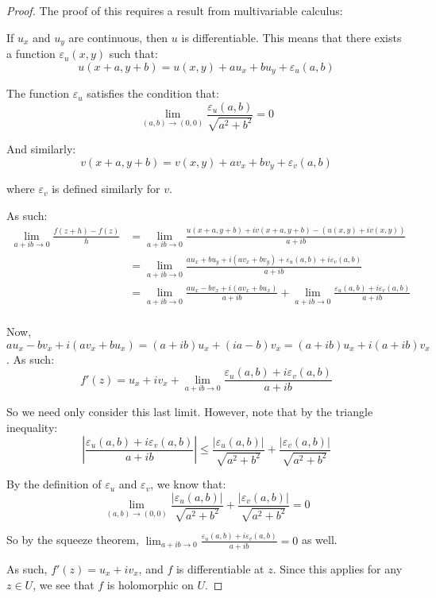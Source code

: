 \begin{proof} The proof of this requires a result from multivariable calculus:

If $u_x$ and $u_y$ are continuous, then $u$ is differentiable. This means that there exists a function $\varepsilon_u(x,y)$ such that:
$$u(x + a,y+b) = u(x,y) + au_x + bu_y  + \varepsilon_u(a,b)$$

\noin The function $\varepsilon_u$ satisfies the condition that:
$$\lim_{(a,b) \rightarrow (0,0)} \frac{\varepsilon_u(a,b)}{\sqrt{a^2 + b^2}} = 0$$

And similarly:
$$v(x + a,y+b) = v(x,y) + av_x + bv_y  + \varepsilon_v(a,b)$$

\noin where $\varepsilon_v$ is defined similarly for $v$.

As such:
\begin{align*}\lim_{a+ib \rightarrow 0} \frac{f(z + h) - f(z)}{h} &= \lim_{a+ib \rightarrow 0} \frac{u(x+a,y+b) + iv(x+a,y+b) - (u(x,y) + iv(x,y))}{a+ib}\\
&= \lim_{a+ib \rightarrow 0} \frac{au_x + bu_y + i(av_x + bv_y) + \varepsilon_u(a,b) + i\varepsilon_v(a,b)}{a+ib}\\
&= \lim_{a+ib \rightarrow 0} \frac{au_x - bv_x + i(av_x + bu_x)}{a + ib} +\lim_{a+ib \rightarrow 0} \frac{\varepsilon_u(a,b) + i\varepsilon_v(a,b)}{a+ib}\\
\end{align*}

Now, $au_x -bv_x + i(av_x + bu_x) = (a+ib)u_x + (ia - b)v_x = (a+ib)u_x + i(a+ib)v_x$. As such:
$$f'(z) = u_x + iv_x  +\lim_{a+ib \rightarrow 0} \frac{\varepsilon_u(a,b) + i\varepsilon_v(a,b)}{a+ib}$$

So we need only consider this last limit. However, note that by the triangle inequality:
$$\left|\frac{\varepsilon_u(a,b) + i\varepsilon_v(a,b)}{a+ib}\right| \le \frac{|\varepsilon_u(a,b)|}{\sqrt{a^2 + b^2}} + \frac{|\varepsilon_v(a,b)|}{\sqrt{a^2 + b^2}}$$

By the definition of $\varepsilon_u$ and $\varepsilon_v$, we know that:
$$\lim_{(a,b)\rightarrow (0,0)} \frac{|\varepsilon_u(a,b)|}{\sqrt{a^2 + b^2}} + \frac{|\varepsilon_v(a,b)|}{\sqrt{a^2 + b^2}} = 0$$

So by the squeeze theorem, $\lim_{a+ib \rightarrow 0} \frac{\varepsilon_u(a,b) + i\varepsilon_v(a,b)}{a+ib} = 0$ as well.

As such, $f'(z) = u_x + iv_x$, and $f$ is differentiable at $z$. Since this applies for any $z\in U$, we see that $f$ is holomorphic on $U$.
\end{proof}


